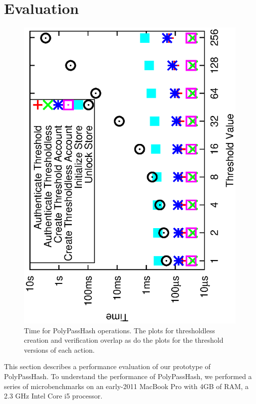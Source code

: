 \section{Evaluation}
\label{sec-evaluation}

\begin{figure}[t]
    \includegraphics[width=.75\columnwidth, angle=270]{resultdata/onebigtimegraph.eps}
	\caption{Time for PolyPassHash operations.  The plots for thresholdless
creation and verification overlap as do the plots for the threshold versions
of each action.}
	\label{fig:time_basic_operations}  
\end{figure}
This section describes a performance evaluation of our prototype of 
PolyPassHash.   
To understand the performance of PolyPassHash,
we performed a series of microbenchmarks on an early-2011 MacBook Pro with 
4GB of RAM, a 2.3 GHz Intel Core i5 processor.  



